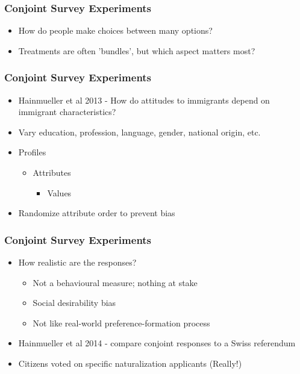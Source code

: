 \documentclass[xcolor=x11names,compress]{beamer}\usepackage[]{graphicx}\usepackage[]{color}
\renewcommand{\(}{\begin{columns}}
\renewcommand{\)}{\end{columns}}
\newcommand{\<}[1]{\begin{column}{#1}}
\renewcommand{\>}{\end{column}}
\begin{document}
\begin{frame}
\frametitle{Conjoint Survey Experiments}
\begin{itemize}
\item How do people make choices between many options?
\item Treatments are often 'bundles', but which aspect matters most?
\end{itemize}
\end{frame}

\begin{frame}
\frametitle{Conjoint Survey Experiments}
\begin{itemize}
\item Hainmueller et al 2013 - How do attitudes to immigrants depend on immigrant characteristics?
\pause
\item Vary education, profession, language, gender, national origin, etc.
\item Profiles
\begin{itemize}
\item Attributes
\begin{itemize}
\item Values
\end{itemize}
\end{itemize}
\item Randomize attribute order to prevent bias
\end{itemize}
\end{frame}





\begin{frame}
\frametitle{Conjoint Survey Experiments}
\begin{itemize}
\item How realistic are the responses?
\begin{itemize}
\item Not a behavioural measure; nothing at stake
\item Social desirability bias
\item Not like real-world preference-formation process
\end{itemize}
\item Hainmueller et al 2014 - compare conjoint responses to a Swiss referendum
\item Citizens voted on specific naturalization applicants (Really!)
\end{itemize}
\end{frame}
\end{document}
